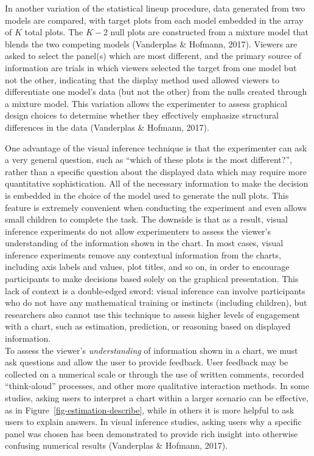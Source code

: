 \documentclass[
  10pt,
]{article}
\begin{document}
In another variation of the statistical lineup procedure, data generated
from two models are compared, with target plots from each model embedded
in the array of \(K\) total plots. The \(K-2\) null plots are
constructed from a mixture model that blends the two competing models
(Vanderplas \& Hofmann, 2017). Viewers are asked to select the panel(s)
which are most different, and the primary source of information are
trials in which viewers selected the target from one model but not the
other, indicating that the display method used allowed viewers to
differentiate one model's data (but not the other) from the nulls
created through a mixture model. This variation allows the experimenter
to assess graphical design choices to determine whether they effectively
emphasize structural differences in the data (Vanderplas \& Hofmann,
2017).

One advantage of the visual inference technique is that the experimenter
can ask a very general question, such as ``which of these plots is the
most different?'', rather than a specific question about the displayed
data which may require more quantitative sophistication. All of the
necessary information to make the decision is embedded in the choice of
the model used to generate the null plots. This feature is extremely
convenient when conducting the experiment and even allows small children
to complete the task. The downside is that as a result, visual inference
experiments do not allow experimenters to assess the viewer's
understanding of the information shown in the chart. In most cases,
visual inference experiments remove any contextual information from the
charts, including axis labels and values, plot titles, and so on, in
order to encourage participants to make decisions based solely on the
graphical presentation. This lack of context is a double-edged sword:
visual inference can involve participants who do not have any
mathematical training or instincts (including children), but researchers
also cannot use this technique to assess higher levels of engagement
with a chart, such as estimation, prediction, or reasoning based on
displayed information.\\

To assess the viewer's \emph{understanding} of information shown in a
chart, we must ask questions and allow the user to provide feedback.
User feedback may be collected on a numerical scale or through the use
of written comments, recorded ``think-aloud'' processes, and other more
qualitative interaction methods. In some studies, asking users to
interpret a chart within a larger scenario can be effective, as in
Figure~\ref{fig-estimation-describe}, while in others it is more helpful
to ask users to explain answers. In visual inference studies, asking
users why a specific panel was chosen has been demonstrated to provide
rich insight into otherwise confusing numerical results (Vanderplas \&
Hofmann, 2017).
\end{document}
